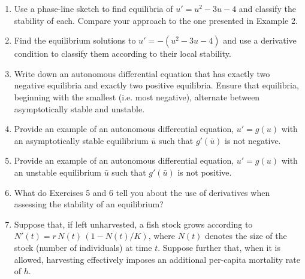 \documentclass[11pt]{article}
\begin{document}
\begin{enumerate}
\begin{enumerate}
        \begin{minipage}{2in}
          \begin{enumerate}
            \item $u'(t) + u(t) = 1$
            \item $u'(t) + tu(t) = 0$
            \item $u'(t) - u(t) = \sin t$
            \item $y'(x) = y(x)^2$
          \end{enumerate}
        \end{minipage}
        \hspace{0.25in}
        \begin{minipage}{2.5in}
          \begin{enumerate}
            \item[(e)] $y'(x) = x^2y(x)$
            \item[(f)] $u' = (u+1)(u-1)$
            \item[(g)] $u'(t) = (u+t)(u-t)$
            \item[(h)] $y' = y(a - y)$, $a$ constant
          \end{enumerate}
        \end{minipage}
      \item Use a phase-line sketch to find equilibria of $u'=u^2-3u-4$ and classify the stability of each. Compare your approach to the one presented in Example 2.
      \item Find the equilibrium solutions to $u' = -(u^2-3u-4)$ and use a derivative condition to classify them according to their local stability.
      \item Write down an autonomous differential equation that has exactly two negative equilibria and exactly two positive equilibria. Ensure that equilibria, beginning with the smallest (i.e. most negative), alternate between asymptotically stable and unstable.
      \item Provide an example of an autonomous differential equation, $u' = g(u)$ with an asymptotically stable equilibrium $\bar u$ such that $g'(\bar u)$ is not negative.
      \item Provide an example of an autonomous differential equation, $u' = g(u)$ with an unstable equilibrium $\bar u$ such that $g'(\bar u)$ is not positive. 
      \item What do Exercises 5 and 6 tell you about the use of derivatives when assessing the stability of an equilibrium?
      \item Suppose that, if left unharvested, a fish stock grows according to $N'(t) = r \, N(t)\, (1 -N(t)/K)$, where $N(t)$ denotes the size of the stock (number of individuals) at time $t$. Suppose further that, when it is allowed, harvesting effectively imposes an additional per-capita mortality rate of $h$. 

\end{enumerate}
\end{enumerate}
\end{document}
